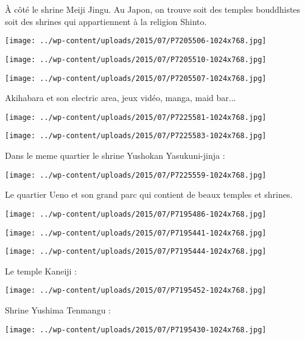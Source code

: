 \pagebreak
 \`A côté le shrine Meiji Jingu. Au Japon, on trouve soit des temples bouddhistes soit des shrines qui appartiennent à la religion Shinto. 
\begin{center} \texttt{[image: ../wp-content/uploads/2015/07/P7205506-1024x768.jpg]} \end{center}
\begin{center} \texttt{[image: ../wp-content/uploads/2015/07/P7205510-1024x768.jpg]} \end{center}
\begin{center} \texttt{[image: ../wp-content/uploads/2015/07/P7205507-1024x768.jpg]} \end{center}

 Akihabara et son \og electric area\fg, jeux vidéo, manga, maid bar...
\begin{center} \texttt{[image: ../wp-content/uploads/2015/07/P7225581-1024x768.jpg]} \end{center}
\begin{center} \texttt{[image: ../wp-content/uploads/2015/07/P7225583-1024x768.jpg]} \end{center}

  Dans le meme quartier le shrine Yushokan Yasukuni-jinja :
\begin{center} \texttt{[image: ../wp-content/uploads/2015/07/P7225559-1024x768.jpg]} \end{center}

\pagebreak
  Le quartier Ueno et son grand parc qui contient de beaux temples et shrines. 
\begin{center} \texttt{[image: ../wp-content/uploads/2015/07/P7195486-1024x768.jpg]} \end{center}
\begin{center} \texttt{[image: ../wp-content/uploads/2015/07/P7195441-1024x768.jpg]} \end{center}
\begin{center} \texttt{[image: ../wp-content/uploads/2015/07/P7195444-1024x768.jpg]} \end{center}

  Le temple Kaneiji :
\begin{center} \texttt{[image: ../wp-content/uploads/2015/07/P7195452-1024x768.jpg]} \end{center}

\pagebreak
 Shrine Yushima Tenmangu : 
\begin{center} \texttt{[image: ../wp-content/uploads/2015/07/P7195430-1024x768.jpg]} \end{center}

